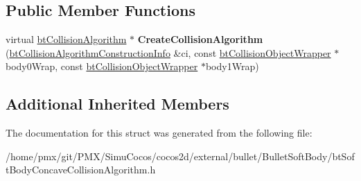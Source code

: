 \subsection*{Public Member Functions}
\begin{DoxyCompactItemize}
\item 
\mbox{\label{structbtSoftBodyConcaveCollisionAlgorithm_1_1CreateFunc_ab0c4877d1c52995f2634e8a6a3d300db}} 
virtual \hyperlink{classbtCollisionAlgorithm}{bt\+Collision\+Algorithm} $\ast$ {\bfseries Create\+Collision\+Algorithm} (\hyperlink{structbtCollisionAlgorithmConstructionInfo}{bt\+Collision\+Algorithm\+Construction\+Info} \&ci, const \hyperlink{structbtCollisionObjectWrapper}{bt\+Collision\+Object\+Wrapper} $\ast$body0\+Wrap, const \hyperlink{structbtCollisionObjectWrapper}{bt\+Collision\+Object\+Wrapper} $\ast$body1\+Wrap)
\end{DoxyCompactItemize}
\subsection*{Additional Inherited Members}


The documentation for this struct was generated from the following file\+:\begin{DoxyCompactItemize}
\item 
/home/pmx/git/\+P\+M\+X/\+Simu\+Cocos/cocos2d/external/bullet/\+Bullet\+Soft\+Body/bt\+Soft\+Body\+Concave\+Collision\+Algorithm.\+h\end{DoxyCompactItemize}
